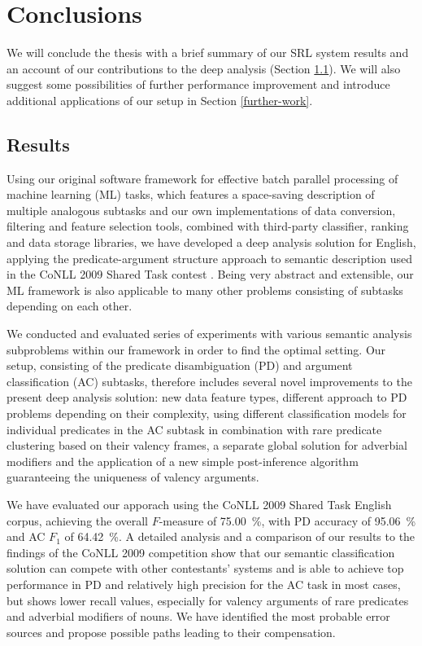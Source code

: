 \documentclass[12pt,notitlepage,a4paper]{report}
\begin{document}
%
%
\chapter{Conclusions}\label{conclusions}
%
%

We will conclude the thesis with a brief summary of our SRL system results and an account of our contributions to the deep analysis (Section \ref{discussion}). We will also suggest some possibilities of further performance improvement and introduce additional applications of our setup in Section \ref{further-work}.

\section{Results}\label{discussion}

Using our original software framework for effective batch parallel processing of machine learning (ML) tasks, which features a space-saving description of multiple analogous subtasks and our own implementations of data conversion, filtering and feature selection tools, combined with third-party classifier, ranking and data storage libraries, we have developed a deep analysis solution for English, applying the predicate-argument structure approach to semantic description used in the CoNLL 2009 Shared Task contest \citep[introduced in Chapter \ref{data}]{hajic09}. Being very abstract and extensible, our ML framework is also applicable to many other problems consisting of subtasks depending on each other.

We conducted and evaluated series of experiments with various semantic ana\-lysis subproblems within our framework in order to find the optimal setting. Our setup, consisting of the predicate disambiguation (PD) and argument classification (AC) subtasks, therefore includes several novel improvements to the present deep analysis solution: new data feature types, different approach to PD problems depending on their complexity, using different classification models for individual predicates in the AC subtask in combination with rare predicate clustering based on their valency frames, a separate global solution for adverbial modifiers and the application of a new simple post-inference algorithm guaranteeing the uniqueness of valency arguments.

We have evaluated our apporach using the CoNLL 2009 Shared Task English corpus, achieving the overall $F$-measure of 75.00~\%, with PD accuracy of 95.06~\% and AC $F_1$ of 64.42~\%. A detailed analysis and a comparison of our results to the findings of the CoNLL 2009 competition show that our semantic classification solution can compete with other contestants' systems and is able to achieve top performance in PD and relatively high precision for the AC task in most cases, but shows lower recall values, especially for valency arguments of rare predicates and adverbial modifiers of nouns. We have identified the most probable error sources and propose possible paths leading to their compensation.
\end{document}
